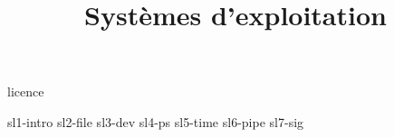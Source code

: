 \documentclass [xcolor=table] {beamer}
\title {Systèmes d'exploitation}
\begin{document}

 {licence}

 {sl1-intro}
 {sl2-file}
 {sl3-dev}
 {sl4-ps}
 {sl5-time}
 {sl6-pipe}
 {sl7-sig}
\end{document}
